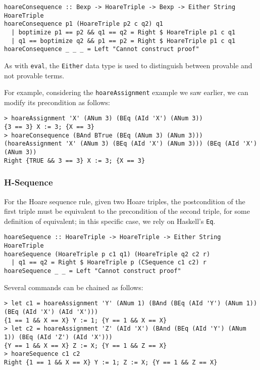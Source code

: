 \documentclass{article}
\begin{document}
\begin{lstlisting}
hoareConsequence :: Bexp -> HoareTriple -> Bexp -> Either String HoareTriple
hoareConsequence p1 (HoareTriple p2 c q2) q1
  | boptimize p1 == p2 && q1 == q2 = Right $ HoareTriple p1 c q1
  | q1 == boptimize q2 && p1 == p2 = Right $ HoareTriple p1 c q1
hoareConsequence _ _ _ = Left "Cannot construct proof"
\end{lstlisting}

As with \texttt{eval}, the \texttt{Either} data type is used to distinguish between provable and not provable terms.

For example, considering the \texttt{hoareAssignment} example we saw earlier, we can modify its precondition as follows:

\begin{lstlisting}
> hoareAssignment 'X' (ANum 3) (BEq (AId 'X') (ANum 3))
{3 == 3} X := 3; {X == 3}
> hoareConsequence (BAnd BTrue (BEq (ANum 3) (ANum 3))) (hoareAssignment 'X' (ANum 3) (BEq (AId 'X') (ANum 3))) (BEq (AId 'X') (ANum 3))
Right {TRUE && 3 == 3} X := 3; {X == 3}
\end{lstlisting}

\subsubsection{H-Sequence}

For the Hoare sequence rule, given two Hoare triples, the postcondition of the first triple must be equivalent to the precondition of the second triple, for some definition of equivalent; in this specific case, we rely on Haskell's \texttt{Eq}.

\begin{lstlisting}
hoareSequence :: HoareTriple -> HoareTriple -> Either String HoareTriple
hoareSequence (HoareTriple p c1 q1) (HoareTriple q2 c2 r)
  | q1 == q2 = Right $ HoareTriple p (CSequence c1 c2) r
hoareSequence _ _ = Left "Cannot construct proof"
\end{lstlisting}

Several commands can be chained as follows:

\begin{lstlisting}
> let c1 = hoareAssignment 'Y' (ANum 1) (BAnd (BEq (AId 'Y') (ANum 1)) (BEq (AId 'X') (AId 'X')))
{1 == 1 && X == X} Y := 1; {Y == 1 && X == X}
> let c2 = hoareAssignment 'Z' (AId 'X') (BAnd (BEq (AId 'Y') (ANum 1)) (BEq (AId 'Z') (AId 'X')))
{Y == 1 && X == X} Z := X; {Y == 1 && Z == X}
> hoareSequence c1 c2
Right {1 == 1 && X == X} Y := 1; Z := X; {Y == 1 && Z == X}
\end{lstlisting}
\end{document}
